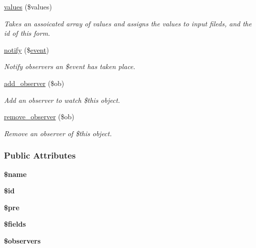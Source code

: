 \begin{DoxyCompactItemize}
\hyperlink{classforms_ad66e3f3a4d5332bbd15e53680930d786}{values} (\$values)
\begin{DoxyCompactList}\small\item\em Takes an assoicated array of values and assigns the values to input fileds, and the id of this form. \end{DoxyCompactList}\item 
\hyperlink{classforms_a82bc2b5e603ecd535f362c3dfdcae96e}{notify} (\$\hyperlink{classevent}{event})
\begin{DoxyCompactList}\small\item\em Notify observers an \$event has taken place. \end{DoxyCompactList}\item 
\hyperlink{classforms_a6c88ab2728699cc06ba8110b1f5aacbc}{add\-\_\-observer} (\$ob)
\begin{DoxyCompactList}\small\item\em Add an observer to watch \$this object. \end{DoxyCompactList}\item 
\hyperlink{classforms_af5c72c905909819f8824958c2faa015d}{remove\-\_\-observer} (\$ob)
\begin{DoxyCompactList}\small\item\em Remove an observer of \$this object. \end{DoxyCompactList}\end{DoxyCompactItemize}
\subsubsection*{Public Attributes}
\begin{DoxyCompactItemize}
\item 
\hypertarget{classforms_aa84609327e0f9bdf2ba799c8cd2268fd}{{\bfseries \$name}}\label{classforms_aa84609327e0f9bdf2ba799c8cd2268fd}

\item 
\hypertarget{classforms_a43144384180122ef4434845671a45e4c}{{\bfseries \$id}}\label{classforms_a43144384180122ef4434845671a45e4c}

\item 
\hypertarget{classforms_a55665dfe896e78efdfd33a650f6e2d7c}{{\bfseries \$pre}}\label{classforms_a55665dfe896e78efdfd33a650f6e2d7c}

\item 
\hypertarget{classforms_a4df40ac2adbfb971665ab358fc8954b5}{{\bfseries \$fields}}\label{classforms_a4df40ac2adbfb971665ab358fc8954b5}

\item 
\hypertarget{classforms_aebf137dbe732b7eee3786e3b1ec24535}{{\bfseries \$observers}}\label{classforms_aebf137dbe732b7eee3786e3b1ec24535}

\end{DoxyCompactItemize}


